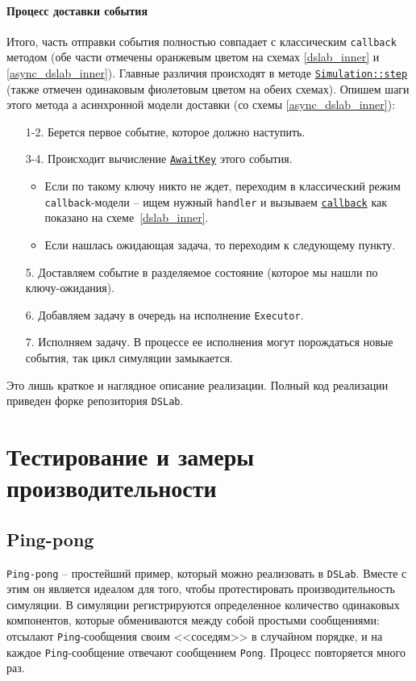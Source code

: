 \paragraph{Процесс доставки события} Итого, часть отправки события полностью совпадает с классическим \texttt{callback} методом (обе части отмечены оранжевым цветом на схемах \ref{dslab_inner} и \ref{async_dslab_inner}). Главные различия происходят в методе \hyperref[Simulation::step]{\texttt{Simulation::step}} (также отмечен одинаковым фиолетовым цветом на обеих схемах). Опишем шаги этого метода а асинхронной модели доставки (со схемы \ref{async_dslab_inner}):
\begin{enumerate}
    \item[1-2.] Берется первое событие, которое должно наступить. 
    \item[3-4.] Происходит вычисление \hyperref[awaitkey]{\texttt{AwaitKey}} этого события.
    \begin{itemize} \item Если по такому ключу никто не ждет, переходим в классический режим \texttt{callback}-модели -- ищем нужный \texttt{handler} и вызываем \hyperref[fnon]{\texttt{callback}} как показано на схеме~\ref{dslab_inner}.
        \item Если нашлась ожидающая задача, то переходим к следующему пункту.
    \end{itemize}
    \item[5.] Доставляем событие в разделяемое состояние (которое мы нашли по ключу-ожидания).
    \item[6.] Добавляем задачу в очередь на исполнение \texttt{Executor}.
    \item[7.] Исполняем задачу. В процессе ее исполнения могут порождаться новые события, так цикл симуляции замыкается.  
\end{enumerate}

Это лишь краткое и наглядное описание реализации. Полный код реализации приведен форке репозитория \texttt{DSLab}\cite{async-dslab-core}. 
\section{Тестирование и замеры производительности} \label{async-testing}

\subsection{Ping-pong}

\texttt{Ping-pong} -- простейший пример, который можно реализовать в \texttt{DSLab}. Вместе с этим он является идеалом для того, чтобы протестировать производительность симуляции. В симуляции регистрируются определенное количество одинаковых компонентов, которые обмениваются между собой простыми сообщениями: отсылают \texttt{Ping}-сообщения своим <<соседям>> в случайном порядке, и на каждое \texttt{Ping}-сообщение отвечают сообщением \texttt{Pong}. Процесс повторяется много раз.


